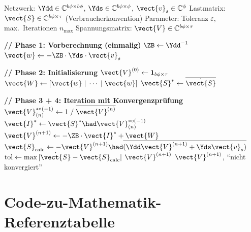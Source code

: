 \begin{algorithm}[H]
	\caption{Tensor Power Flow -- Dense-Formulierung (Verbraucherkonvention)}
	\label{alg:tpf_dense}
	\begin{algorithmic}[1]
		\REQUIRE Netzwerk: $\Ydd \in \mathbb{C}^{b\phi \times b\phi}$, $\Yds \in \mathbb{C}^{b\phi \times \phi}$, $\vect{v}_s \in \mathbb{C}^{\phi}$
		\REQUIRE Lastmatrix: $\dot{\vect{S}} \in \mathbb{C}^{b\phi \times \tau}$ (Verbraucherkonvention)
		\REQUIRE Parameter: Toleranz $\varepsilon$, max.\ Iterationen $n_{\max}$
		\ENSURE Spannungsmatrix: $\vect{V} \in \mathbb{C}^{b\phi \times \tau}$
		
		\STATE \textbf{// Phase 1: Vorberechnung (einmalig)}
		\STATE $\ZB \leftarrow \Ydd^{-1}$ 
		\STATE $\vect{w} \leftarrow -\ZB \cdot \Yds \cdot \vect{v}_s$ 
		
		\STATE \textbf{// Phase 2: Initialisierung}
		\STATE $\vect{V}^{(0)} \leftarrow \mathbf{1}_{b\phi \times \tau}$ 
		\STATE $\vect{W} \leftarrow [\vect{w} \;|\; \cdots \;|\; \vect{w}]$ 
		\STATE $\vect{S}^* \leftarrow \overline{\dot{\vect{S}}}$ 
		
		\STATE \textbf{// Phase 3 + 4: Iteration mit Konvergenzprüfung}
		\STATE $\vect{V}_{(n)}^{*\circ(-1)} \leftarrow 1 \;/\; \overline{\vect{V}^{(n)}}$ 
		\STATE $\vect{I}^* \leftarrow \vect{S}^* \had \vect{V}_{(n)}^{*\circ(-1)}$ 
		\STATE $\vect{V}^{(n+1)} \leftarrow -\ZB \cdot \vect{I}^* + \vect{W}$ 
		\STATE $\vect{S}_{\text{calc}} \leftarrow -\vect{V}^{(n+1)} \had \overline{(\Ydd \vect{V}^{(n+1)} + \Yds \vect{v}_s)}$ 
		\STATE $\text{tol} \leftarrow \max|\dot{\vect{S}} - \vect{S}_{\text{calc}}|$
		\RETURN $\vect{V}^{(n+1)}$ 
		\ENDIF
		\ENDFOR
		\RETURN $\vect{V}^{(n+1)}$, ``nicht konvergiert''
	\end{algorithmic}
\end{algorithm}

\section{Code-zu-Mathematik-Referenztabelle}
\label{sec:referenztabelle}

